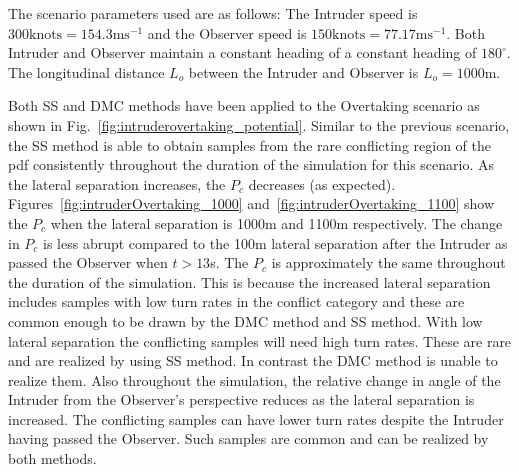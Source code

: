 \documentclass[journal]{IEEEtran}
\begin{document}
The scenario parameters used are as follows: The Intruder speed is $300 \text{knots} = 154.3 \text{ms}^{-1}$ and the Observer speed is $150 \text{knots} = 77.17 \text{ms}^{-1}$. Both Intruder and Observer maintain a constant heading of a constant heading of $180^{\circ}$. The longitudinal distance $L_{o}$ between the Intruder and Observer is $L_{o} = 1000\text{m}$.

Both SS and DMC methods have been applied to the Overtaking scenario as shown in Fig.~\ref{fig:intruderovertaking_potential}. Similar to the previous scenario, the SS method is able to obtain samples from the rare conflicting region of the pdf consistently throughout the duration of the simulation for this scenario. As the lateral separation increases, the $P_{c}$ decreases (as expected). Figures~\ref{fig:intruderOvertaking_1000} and~\ref{fig:intruderOvertaking_1100} show the $P_{c}$ when the lateral separation is 1000m and 1100m respectively. The change in $P_{c}$ is less abrupt compared to the 100m lateral separation after the Intruder as passed the Observer when $t > 13$s. The $P_{c}$ is approximately the same throughout the duration of the simulation. This is because the increased lateral separation includes samples with low turn rates in the conflict category and these are common enough to be drawn by the DMC method and SS method. With low lateral separation the conflicting samples will need high turn rates. These are rare and are realized by using SS method. In contrast the DMC method is unable to realize them. Also throughout the simulation, the relative change in angle of the Intruder from the Observer's perspective reduces as the lateral separation is increased. The conflicting samples can have lower turn rates despite the Intruder having passed the Observer. Such samples are common and can be realized by both methods.
\end{document}
